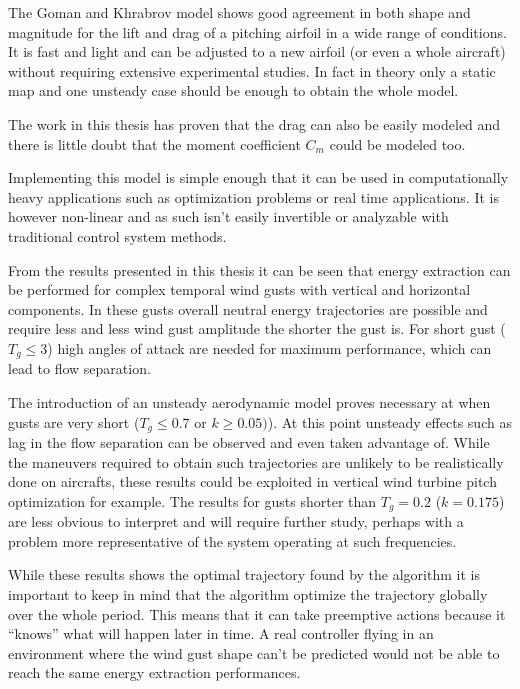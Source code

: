 
\par The Goman and Khrabrov model shows good agreement in both shape and magnitude for the lift and drag of a pitching airfoil in a wide range of conditions.
It is fast and light and can be adjusted to a new airfoil (or even a whole aircraft) without requiring extensive experimental studies.
In fact in theory only a static map and one unsteady case should be enough to obtain the whole model.

\par The work in this thesis has proven that the drag can also be easily modeled and there is little doubt that the moment coefficient $C_m$ could be modeled too.

\par Implementing this model is simple enough that it can be used in computationally heavy applications such as optimization problems or real time applications.
It is however non-linear and as such isn't easily invertible or analyzable with traditional control system methods.


\par From the results presented in this thesis it can be seen that energy extraction can be performed for complex temporal wind gusts with vertical and horizontal components.
In these gusts overall neutral energy trajectories are possible and require less and less wind gust amplitude the shorter the gust is.
For short gust ($T_g \le 3$) high angles of attack are needed for maximum performance, which can lead to flow separation.

\par The introduction of an unsteady aerodynamic model proves necessary at when gusts are very short ($T_g \le 0.7$ or $k \ge 0.05)$).
At this point unsteady effects such as lag in the flow separation can be observed and even taken advantage of.
While the maneuvers required to obtain such trajectories are unlikely to be realistically done on aircrafts, these results could be exploited in vertical wind turbine pitch optimization for example.
The results for gusts shorter than $T_g=0.2$ ($k=0.175$) are less obvious to interpret and will require further study, perhaps with a problem more representative of the system operating at such frequencies.

\par While these results shows the optimal trajectory found by the algorithm it is important to keep in mind that the algorithm optimize the trajectory globally over the whole period.
This means that it can take preemptive actions because it ``knows'' what will happen later in time.
A real controller flying in an environment where the wind gust shape can't be predicted would not be able to reach the same energy extraction performances.

